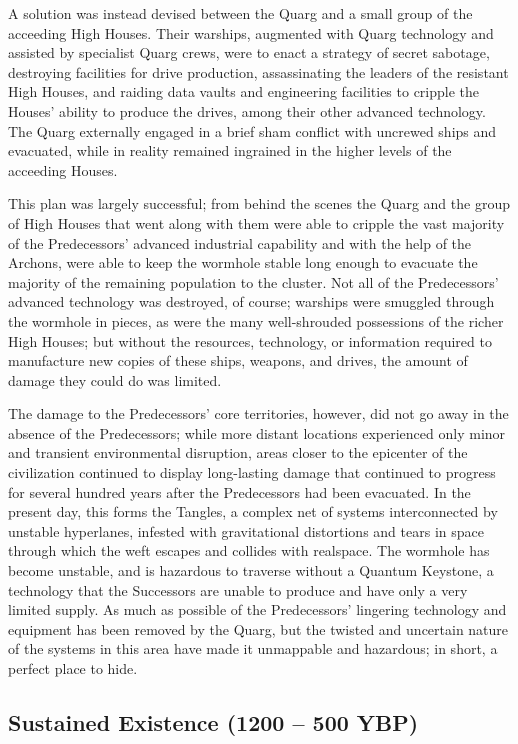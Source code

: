 \documentclass[11pt]{report}
\begin{document}
    A solution was instead devised between the Quarg and a small group of the acceeding High Houses. Their warships, augmented with Quarg technology and assisted by specialist Quarg crews, were to enact a strategy of secret sabotage, destroying facilities for drive production, assassinating the leaders of the resistant High Houses, and raiding data vaults and engineering facilities to cripple the Houses' ability to produce the drives, among their other advanced technology. The Quarg externally engaged in a brief sham conflict with uncrewed ships and evacuated, while in reality remained ingrained in the higher levels of the acceeding Houses.

    This plan was largely successful; from behind the scenes the Quarg and the group of High Houses that went along with them were able to cripple the vast majority of the Predecessors' advanced industrial capability and with the help of the Archons, were able to keep the wormhole stable long enough to evacuate the majority of the remaining population to the cluster. Not all of the Predecessors' advanced technology was destroyed, of course; warships were smuggled through the wormhole in pieces, as were the many well-shrouded possessions of the richer High Houses; but without the resources, technology, or information required to manufacture new copies of these ships, weapons, and drives, the amount of damage they could do was limited.

    The damage to the Predecessors' core territories, however, did not go away in the absence of the Predecessors; while more distant locations experienced only minor and transient environmental disruption, areas closer to the epicenter of the civilization continued to display long-lasting damage that continued to progress for several hundred years after the Predecessors had been evacuated. In the present day, this forms the Tangles, a complex net of systems interconnected by unstable hyperlanes, infested with gravitational distortions and tears in space through which the weft escapes and collides with realspace. The wormhole has become unstable, and is hazardous to traverse without a Quantum Keystone, a technology that the Successors are unable to produce and have only a very limited supply. As much as possible of the Predecessors' lingering technology and equipment has been removed by the Quarg, but the twisted and uncertain nature of the systems in this area have made it unmappable and hazardous; in short, a perfect place to hide.

    \subsection{Sustained Existence (1200 -- 500 YBP)}
\end{document}
